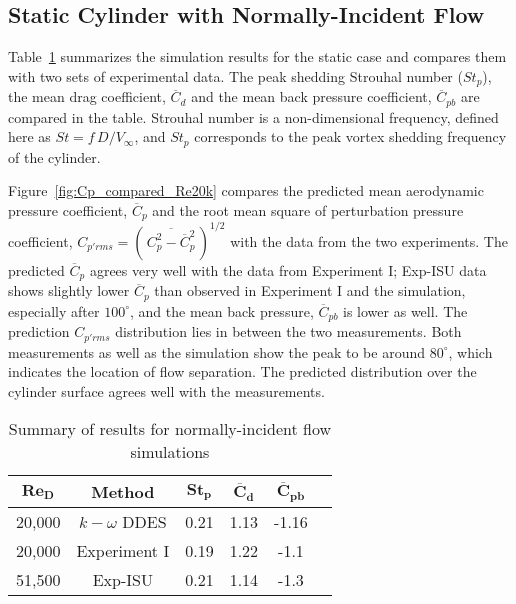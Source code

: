 \subsection{Static Cylinder with Normally-Incident Flow}
\label{sec:normally_incident}
%
Table~\ref{tab:comparisonRe20k} summarizes the simulation results for the
static case and compares them with two sets of experimental data. The peak
shedding Strouhal number ($St_p$), the mean drag coefficient, $\overline{C}_d$
and the mean back pressure coefficient, $\overline{C}_{pb}$ are compared in the
table. Strouhal number is a non-dimensional frequency, defined here as $St =
f\,D/V_\infty$, and $St_p$ corresponds to the peak vortex shedding frequency of
the cylinder.

Figure~\ref{fig:Cp_compared_Re20k} compares the predicted mean aerodynamic
pressure coefficient, $\overline{C}_p$ and the root mean square of perturbation
pressure coefficient, $C_{p'rms} = \left(\,\overline{C^2_p -
\overline{C}^2_p}\,\right)^{1/2}$ with the data from the two experiments. The
predicted $\overline{C}_p$ agrees very well with the data from Experiment I;
Exp-ISU data shows slightly lower $\overline{C}_p$ than observed in
Experiment I and the simulation, especially after $100^\circ$, and the mean
back pressure, $\overline{C}_{pb}$ is lower as well. The prediction
$C_{p'rms}$ distribution lies in between the two measurements. Both
measurements as well as the simulation show the peak to be around $80^\circ$,
which indicates the location of flow separation. The predicted distribution
over the cylinder surface agrees well with the measurements.
%
\begin{table}[htb!]
  \caption{Summary of results for normally-incident flow simulations} 
  \label{tab:comparisonRe20k} 
  \begin{center}
  \begin{tabular}{c|c|c|c|c|c}
      $\boldsymbol{Re_D}$ & \textbf{Method} & $\boldsymbol{St_p}$ & $\boldsymbol{\overline{C}_d}$ & $\boldsymbol{\overline{C}_{pb}}$ \\ \hline
      \hline
      20,000 & $k-\omega$ DDES & 0.21 & 1.13 & -1.16 \\ \hline
      20,000 & Experiment I    & 0.19 & 1.22 & -1.1  \\ \hline
      51,500 & Exp-ISU   & 0.21 & 1.14 & -1.3  \\ \hline
      \hline
  \end{tabular}
  \end{center}
\end {table}

